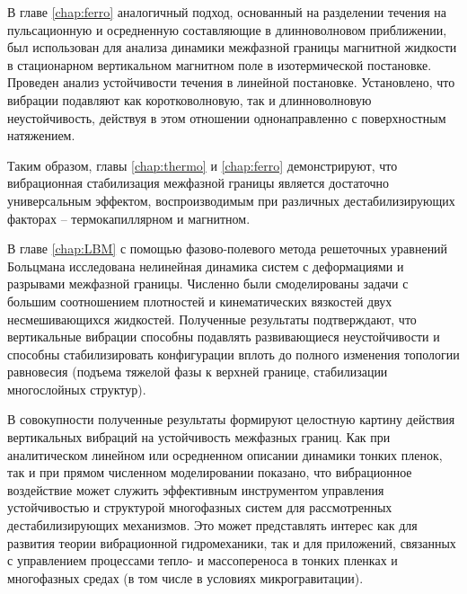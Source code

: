 \documentclass[12pt,a4paper]{article}
\begin{document}
В главе \ref{chap:ferro} аналогичный подход, основанный на разделении течения на пульсационную и осредненную составляющие в длинноволновом приближении, был использован для анализа динамики межфазной границы магнитной жидкости в стационарном вертикальном магнитном поле в изотермической постановке. Проведен анализ устойчивости течения в линейной постановке. Установлено, что вибрации подавляют как коротковолновую, так и длинноволновую неустойчивость, действуя в этом отношении однонаправленно с поверхностным натяжением.

Таким образом, главы \ref{chap:thermo} и \ref{chap:ferro} демонстрируют, что вибрационная стабилизация межфазной границы является достаточно универсальным эффектом, воспроизводимым при различных дестабилизирующих факторах -- термокапиллярном и магнитном.

В главе \ref{chap:LBM} с помощью фазово-полевого метода решеточных уравнений Больцмана исследована нелинейная динамика систем с деформациями и разрывами межфазной границы. Численно были смоделированы задачи с большим соотношением плотностей и кинематических вязкостей двух несмешивающихся жидкостей. Полученные результаты подтверждают, что вертикальные вибрации способны подавлять развивающиеся неустойчивости и способны стабилизировать конфигурации вплоть до полного изменения топологии равновесия (подъема тяжелой фазы к верхней границе, стабилизации многослойных структур). 

В совокупности полученные результаты формируют целостную картину действия вертикальных вибраций на устойчивость межфазных границ. Как при аналитическом линейном или осредненном описании динамики тонких пленок, так и при прямом численном моделировании показано, что вибрационное воздействие может служить эффективным инструментом управления устойчивостью и структурой многофазных систем для рассмотренных дестабилизирующих механизмов. Это может представлять интерес как для развития теории вибрационной гидромеханики, так и для приложений, связанных с управлением процессами тепло- и массопереноса в тонких пленках и многофазных средах (в том числе в условиях микрогравитации).



\newpage



\end{document}
